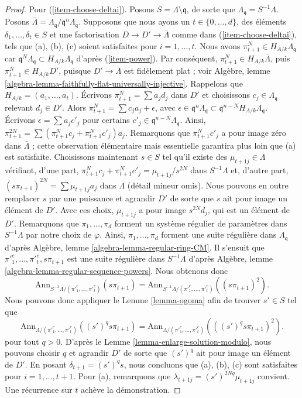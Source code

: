 \begin{proof}
\medskip\noindent
Pour (\ref{item-choose-deltai}). Posons $S = \Lambda \setminus \mathfrak q$,
de sorte que $\Lambda_\mathfrak q = S^{-1}\Lambda$. Posons
$\bar \Lambda = \Lambda_\mathfrak q/\mathfrak q^n \Lambda_\mathfrak q$.
Supposons que nous ayons un $t \in \{0, \ldots, d\}$, des éléments
$\delta_1, \ldots, \delta_t \in S$ et une factorisation
$D \to D' \to \bar \Lambda$ comme dans (\ref{item-choose-deltai}),
tels que (a), (b), (c) soient satisfaites pour $i = 1, \ldots, t$. Nous avons
$\pi_{t + 1}^N \in H_{A/k}\Lambda_\mathfrak q$
car $\mathfrak q^N \Lambda_\mathfrak q \subset H_{A/k}\Lambda_\mathfrak q$
d'après (\ref{item-power}). Par conséquent,
$\pi_{t + 1}^N \in H_{A/k} \bar\Lambda$, puis
$\pi_{t + 1}^N \in H_{A/k}D'$, puisque $D' \to \bar \Lambda$
est fidèlement plat ; voir
Algèbre, lemme \ref{algebra-lemma-faithfully-flat-universally-injective}.
Rappelons que $H_{A/k} = (a_1, \ldots, a_t)$.
Écrivons $\pi_{t + 1}^N = \sum a_j d_j$ dans $D'$ et choisissons
$c_j \in \Lambda_\mathfrak q$ relevant $d_j \in D'$. Alors
$\pi_{t + 1}^N = \sum c_j a_j + \epsilon$, avec
$\epsilon \in \mathfrak q^n\Lambda_\mathfrak q \subset
\mathfrak q^{n - N}H_{A/k}\Lambda_\mathfrak q$.
Écrivons $\epsilon = \sum a_j c'_j$ pour certains
$c'_j \in \mathfrak q^{n - N}\Lambda_\mathfrak q$.
Ainsi, $\pi_{t + 1}^{2N} = \sum (\pi_{t + 1}^N c_j + \pi_{t + 1}^N c'_j) a_j$.
Remarquons que $\pi_{t + 1}^Nc'_j$ a pour image zéro dans $\bar \Lambda$ ; cette observation
élémentaire mais essentielle garantira plus loin que (a) est satisfaite.
Choisissons maintenant $s \in S$ tel qu'il existe des
$\mu_{t + 1j} \in \Lambda$ vérifiant, d'une part,
$\pi_{t + 1}^N c_j + \pi_{t + 1}^N c'_j = \mu_{t + 1j}/s^{2N}$
dans $S^{-1}\Lambda$ et, d'autre part,
$(s \pi_{t + 1})^{2N} = \sum \mu_{t + 1j}a_j$
dans $\Lambda$ (détail mineur omis). Nous pouvons en outre remplacer $s$ par
une puissance et agrandir $D'$ de sorte que $s$ ait pour image un élément de $D'$.
Avec ces choix, $\mu_{t + 1j}$ a pour image $s^{2N}d_j$, qui est
un élément de $D'$. Remarquons que $\pi_1, \ldots, \pi_d$ forment un système
régulier de paramètres dans $S^{-1}\Lambda$ par notre
choix de $\varphi$. Ainsi, $\pi_1, \ldots, \pi_d$ forment une suite régulière
dans $\Lambda_\mathfrak q$ d'après
Algèbre, lemme \ref{algebra-lemma-regular-ring-CM}.
Il s'ensuit que ${\pi'}_1^e, \ldots, {\pi'}_t^e, s\pi_{t + 1}$ est une
suite régulière dans $S^{-1}\Lambda$ d'après
Algèbre, lemme \ref{algebra-lemma-regular-sequence-powers}.
Nous obtenons donc
$$
\text{Ann}_{S^{-1}\Lambda/({\pi'}_1^e, \ldots, {\pi'}_t^e)}(s\pi_{t + 1}) =
\text{Ann}_{S^{-1}\Lambda/({\pi'}_1^e, \ldots, {\pi'}_t^e)}((s\pi_{t + 1})^2).
$$
Nous pouvons donc appliquer le Lemme \ref{lemma-ogoma} afin de trouver $s' \in S$
tel que
$$
\text{Ann}_{\Lambda/({\pi'}_1^e, \ldots, {\pi'}_t^e)}((s')^qs\pi_{t + 1})
=
\text{Ann}_{\Lambda/({\pi'}_1^e, \ldots, {\pi'}_t^e)}(((s')^qs\pi_{t + 1})^2).
$$
pour tout $q > 0$. D'après le Lemme \ref{lemma-enlarge-solution-modulo},
nous pouvons choisir $q$ et agrandir $D'$ de sorte que $(s')^q$ ait pour image un élément
de $D'$. En posant $\delta_{t + 1} = (s')^qs$, nous concluons que
(a), (b), (c) sont satisfaites pour $i = 1, \ldots, t + 1$. Pour (a), remarquons que
$\lambda_{t + 1j} = (s')^{2Nq}\mu_{t + 1j}$ convient.
Une récurrence sur $t$ achève la démonstration.


\end{proof}
